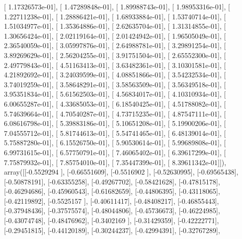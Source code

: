 \documentclass{article}
\begin{document}
       [  1.17326573e-01],
       [  1.47289848e-01],
       [  1.89988743e-01],
       [  1.98953316e-01],
       [  1.22711238e-01],
       [  1.28886421e-01],
       [  1.68933884e-01],
       [  1.53740714e-01],
       [  1.51034977e-01],
       [  1.35364886e-01],
       [  2.62635704e-01],
       [  1.31314855e-01],
       [  1.30656424e-01],
       [  2.02119164e-01],
       [  2.01424942e-01],
       [  1.96505049e-01],
       [  2.36540059e-01],
       [  3.05997876e-01],
       [  2.64988781e-01],
       [  3.29891254e-01],
       [  3.89269629e-01],
       [  2.56204255e-01],
       [  3.91751504e-01],
       [  2.65552300e-01],
       [  2.49779843e-01],
       [  4.51163413e-01],
       [  3.63482361e-01],
       [  3.10301581e-01],
       [  4.21892692e-01],
       [  3.24039599e-01],
       [  4.08851866e-01],
       [  3.54232534e-01],
       [  3.74019259e-01],
       [  3.58648291e-01],
       [  3.58563509e-01],
       [  3.56349518e-01],
       [  3.95351834e-01],
       [  5.61562503e-01],
       [  4.56834017e-01],
       [  4.10310934e-01],
       [  6.00655287e-01],
       [  4.33685053e-01],
       [  6.18540425e-01],
       [  4.51788082e-01],
       [  5.74639664e-01],
       [  4.70540287e-01],
       [  4.73715235e-01],
       [  4.87547111e-01],
       [  6.08616798e-01],
       [  5.39883186e-01],
       [  5.10651208e-01],
       [  5.19900206e-01],
       [  7.04555712e-01],
       [  5.81744613e-01],
       [  5.54741465e-01],
       [  6.48139014e-01],
       [  5.75887280e-01],
       [  6.15526750e-01],
       [  5.90530614e-01],
       [  5.99689808e-01],
       [  6.99731615e-01],
       [  6.57750791e-01],
       [  7.46065402e-01],
       [  6.39617299e-01],
       [  7.75879932e-01],
       [  7.85754010e-01],
       [  7.35447399e-01],
       [  8.39611342e-01]]), array([[-0.5529294 ],
       [-0.66551609],
       [-0.5516902 ],
       [-0.52630995],
       [-0.69565438],
       [-0.50878191],
       [-0.63355258],
       [-0.49267702],
       [-0.58421628],
       [-0.47815178],
       [-0.46294686],
       [-0.45960543],
       [-0.61682659],
       [-0.44806395],
       [-0.43118065],
       [-0.42119892],
       [-0.5525157 ],
       [-0.40611417],
       [-0.48408217],
       [-0.46855443],
       [-0.37948436],
       [-0.37575574],
       [-0.48044806],
       [-0.45736673],
       [-0.46224985],
       [-0.43074748],
       [-0.48476962],
       [-0.3402169 ],
       [-0.31429359],
       [-0.42222771],
       [-0.29451815],
       [-0.44120189],
       [-0.30244237],
       [-0.42994391],
       [-0.32767289],
\end{document}
